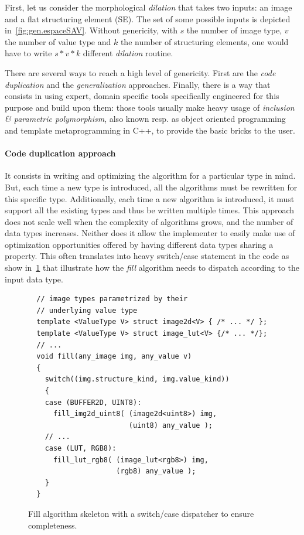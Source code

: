 First, let us consider the morphological \emph{dilation} that takes two inputs: an image and a flat structuring element
(SE). The set of some possible inputs is depicted in~\cref{fig:gen.espaceSAV}. Without genericity, with \(s\) the number
of image type, \(v\) the number of value type and \(k\) the number of structuring elements, one would have to write \(s
* v * k\) different \emph{dilation} routine.

There are several ways to reach a high level of genericity. First are the \emph{code duplication} and the
\emph{generalization} approaches. Finally, there is a way that consists in using expert, domain specific tools
specifically engineered for this purpose and build upon them: those tools usually make heavy usage of \emph{inclusion \&
  parametric polymorphism}, also known resp. as object oriented programming and template metaprogramming in C++, to
provide the basic bricks to the user.

\paragraph{Code duplication approach} It consists in writing and optimizing the algorithm for a particular type in mind.
But, each time a new type is introduced, all the algorithms must be rewritten for this specific type. Additionally, each
time a new algorithm is introduced, it must support all the existing types and thus be written multiple times. This
approach does not scale well when the complexity of algorithms grows, and the number of data types increases. Neither
does it allow the implementer to easily make use of optimization opportunities offered by having different data types
sharing a property. This often translates into heavy switch/case statement in the code as show in~\cref{code:gen.exhau}
that illustrate how the \emph{fill} algorithm needs to dispatch according to the input data type.

\begin{figure}[htbp]
  \centering
  \begin{verbatim}
  // image types parametrized by their
  // underlying value type
  template <ValueType V> struct image2d<V> { /* ... */ };
  template <ValueType V> struct image_lut<V> {/* ... */};
  // ...
  void fill(any_image img, any_value v)
  {
    switch((img.structure_kind, img.value_kind))
    {
    case (BUFFER2D, UINT8):
      fill_img2d_uint8( (image2d<uint8>) img,
                        (uint8) any_value );
    // ...
    case (LUT, RGB8):
      fill_lut_rgb8( (image_lut<rgb8>) img,
                     (rgb8) any_value );
    }
  }
  \end{verbatim}
  \caption{Fill algorithm skeleton with a switch/case dispatcher to ensure completeness.}
  \label{code:gen.exhau}
\end{figure}

